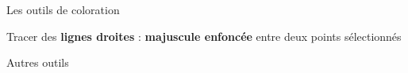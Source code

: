 \begin{frame}{Les outils de coloration}
\begin{overprint}
\begin{enumerate}
{				Tracer des \textbf{lignes droites} : \textbf{majuscule enfoncée} entre deux points sélectionnés
		}
	\end{enumerate}
	\end{overprint}
\end{frame}

\begin{frame}{Autres outils}
	\begin{overprint}
	\begin{enumerate}

	\end{enumerate}
	\end{overprint}
\end{frame}


